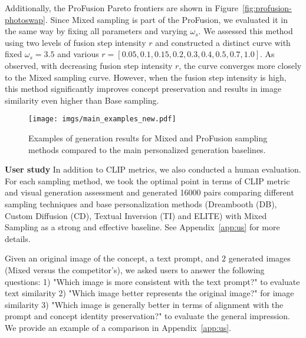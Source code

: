Additionally, the ProFusion Pareto frontiers are shown in Figure~\ref{fig:profusion-photoswap}. Since Mixed sampling is part of the ProFusion, we evaluated it in the same way by fixing all parameters and varying $\omega_s$. We assessed this method using two levels of fusion step intensity $r$ and constructed a distinct curve with fixed $\omega_s=3.5$ and various $r = [0.05, 0.1, 0.15, 0.2, 0.3, 0.4, 0.5, 0.7, 1.0]$. As observed, with decreasing fusion step intensity $r$, the curve converges more closely to the Mixed sampling curve. However, when the fusion step intensity is high, this method significantly improves concept preservation and results in image similarity even higher than Base sampling.

\begin{figure*}[t!]
  \centering
  \texttt{[image: imgs/main\_examples\_new.pdf]}
  \caption{Examples of generation results for Mixed and ProFusion sampling methods compared to the main personalized generation baselines.}
  \label{fig:main_examples}
\end{figure*}

\textbf{User study}
In addition to CLIP metrics, we also conducted a human evaluation. For each sampling method, we took the optimal point in terms of CLIP metric and visual generation assessment and generated \num{16000} pairs comparing different sampling techniques and base personalization methods (Dreambooth (DB), Custom Diffusion (CD), Textual Inversion (TI) and ELITE) with Mixed Sampling as a strong and effective baseline. See Appendix~\ref{app:us} for more details.

Given an original image of the concept, a text prompt, and $2$ generated images (Mixed versus the competitor's), we asked users to answer the following questions: 1) "Which image is more consistent with the text prompt?" to evaluate text similarity 2) "Which image better represents the original image?" for image similarity 3) "Which image is generally better in terms of alignment with the prompt and concept identity preservation?" to evaluate the general impression. We provide an example of a comparison in Appendix~\ref{app:us}.

